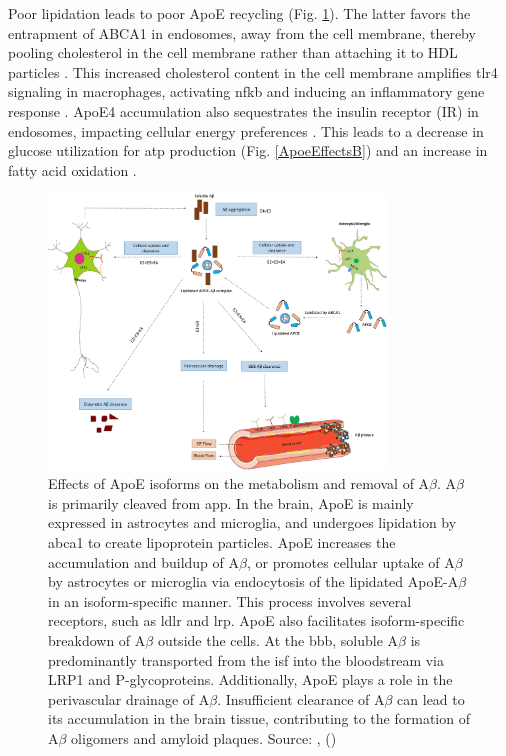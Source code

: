 \documentclass{amsart}
\begin{document}
Poor lipidation leads to poor ApoE recycling \cite{Yassine2020APOEDisease} (Fig. \ref{ApoeEffectsA}). The latter favors the entrapment of ABCA1 in endosomes, away from the cell membrane, thereby pooling cholesterol in the cell membrane rather than attaching it to HDL particles \cite{Rawat2019ApoE4Astrocytes}. This increased cholesterol content in the cell membrane amplifies \acrfull{tlr4} signaling in macrophages, activating \acrshort{nfkb} and inducing an inflammatory gene response \cite{Yassine2020APOEDisease}.  ApoE4 accumulation also sequestrates the insulin receptor (IR) in endosomes, impacting cellular energy preferences \cite{Zhao2017ApolipoproteinEndosomes}. This leads to a decrease in glucose utilization for \acrshort{atp} production (Fig. \ref{ApoeEffectsB}) and an increase in fatty acid oxidation \cite{Svennerholm1997ChangesSwedes}. 

\begin{figure}[t]
  \includegraphics[width=0.8\textwidth]{figures/ApoEeffectsB.jpg}
    \caption{Effects of ApoE isoforms on the metabolism and removal of A$\beta$. A$\beta$ is primarily cleaved from \acrfull{app}. In the brain, ApoE is mainly expressed in astrocytes and microglia, and undergoes lipidation by \acrfull{abca1} to create lipoprotein particles. ApoE increases the accumulation and buildup of A$\beta$, or promotes cellular uptake of A$\beta$ by astrocytes or microglia via endocytosis of the lipidated ApoE-A$\beta$ in an isoform-specific manner. This process involves several receptors, such as \acrfull{ldlr} and \acrfull{lrp}. ApoE also facilitates isoform-specific breakdown of A$\beta$ outside the cells. At the \acrlong{bbb}, soluble A$\beta$ is predominantly transported from the \acrfull{isf} into the bloodstream via LRP1 and P-glycoproteins. Additionally, ApoE plays a role in the perivascular drainage of A$\beta$. Insufficient clearance of A$\beta$ can lead to its accumulation in the brain tissue, contributing to the formation of A$\beta$ oligomers and amyloid plaques. Source: ,  (\citeyear{Husain2021APOETherapeutics}) \cite{Husain2021APOETherapeutics}}
  \label{ApoeEffectsA}
\end{figure}
\end{document}

